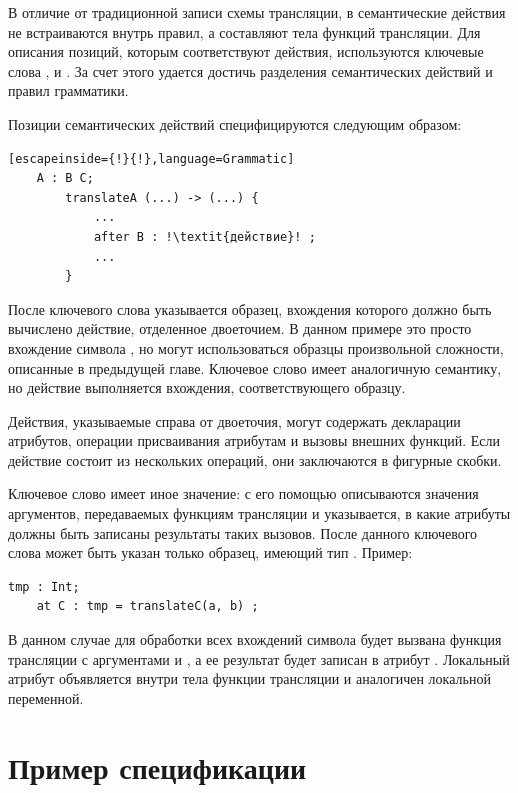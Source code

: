 В отличие от традиционной записи схемы трансляции, в \ATF{} семантические действия не встраиваются внутрь правил, а составляют тела функций трансляции. Для описания позиций, которым соответствуют действия, используются ключевые слова ,  и . За счет этого удается достичь разделения семантических действий и правил грамматики.

Позиции семантических действий специфицируются следующим образом:
\begin{lstlisting}[escapeinside={!}{!},language=Grammatic]
	A : B C;
		translateA (...) -> (...) {
			...
			after B : !\textit{действие}! ;
			...
		}
\end{lstlisting}
После ключевого слова  указывается образец,  вхождения которого должно быть вычислено действие, отделенное двоеточием. В данном примере это просто вхождение символа , но могут использоваться образцы произвольной сложности, описанные в предыдущей главе. Ключевое слово  имеет аналогичную семантику, но действие выполняется  вхождения, соответствующего образцу. 

Действия, указываемые справа от двоеточия, могут содержать декларации атрибутов, операции присваивания атрибутам и вызовы внешних функций. Если действие состоит из нескольких операций, они заключаются в фигурные скобки.

Ключевое слово  имеет иное значение: с его помощью описываются значения аргументов, передаваемых функциям трансляции и указывается, в какие атрибуты должны быть записаны результаты таких вызовов. После данного ключевого слова может быть указан только образец, имеющий тип . Пример:
\begin{lstlisting}[language=Grammatic]
	tmp : Int;
	at C : tmp = translateC(a, b) ;
\end{lstlisting}
В данном случае для обработки всех вхождений символа  будет вызвана функция трансляции  с аргументами  и , а ее результат будет записан в  атрибут . Локальный атрибут объявляется внутри тела функции трансляции и аналогичен локальной переменной.

\section{Пример спецификации}

